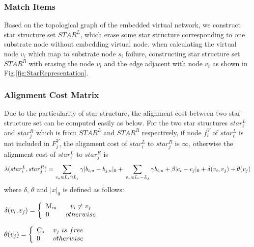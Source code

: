 
\subsubsection{Match Items}
Based on the topological graph of the embedded virtual network, we construct star structure set $STAR^L$, which erase some star structure corresponding to one substrate node without embedding virtual node. when calculating the virtual node $v_i$ which map to substrate node $s_i$ failure, constructing star structure set $STAR^R$ with erasing the node $v_i$ and the edge adjacent with node $v_i$ as shown in Fig.\ref{fig:StarRepresentation}.

\subsubsection{Alignment Cost Matrix}
Due to the particularity of star structure, the alignment cost between two star structure set can be computed easily as below. For the two star structures $star^L_i$ and $star^R_j$ which is from $STAR^L$ and $STAR^R$ respectively, if node $f_i^V$ of $star^L_i$  is not included in $F^V_j$, the alignment cost of $star^L_i$ to $star^R_j$ is $\infty$, otherwise the alignment cost of $star^L_i$ to $star^R_j$ is
\[\lambda(star^L_i,star^R_j)=\sum\limits_{v_u\in L_i \cap L_j}\gamma|b_{i,u}-b_{j,u}|_0+\newline
\sum\limits_{v_u\in L_i - L_j}\gamma b_{i,u}+\beta|c_i-c_j|_0+ \delta(v_i,v_j)+\theta(v_j)\]
where $\delta$, $\theta$ and $|x|_0$ is defined as follows:

$\delta ({v_i},{v_j}) = \left\{ \begin{array}{l}
{\rm{M_{m}}}\\
0
\end{array} \right.\begin{array}{*{20}{c}}
v_i\neq v_j\\
{otherwise}
\end{array}$

$\theta ({v_j}) = \left\{ \begin{array}{l}
{\rm{C_{s}}}\\
0
\end{array} \right.\begin{array}{*{20}{c}}
v_j\ is\ free\\
{otherwise}
\end{array}$

